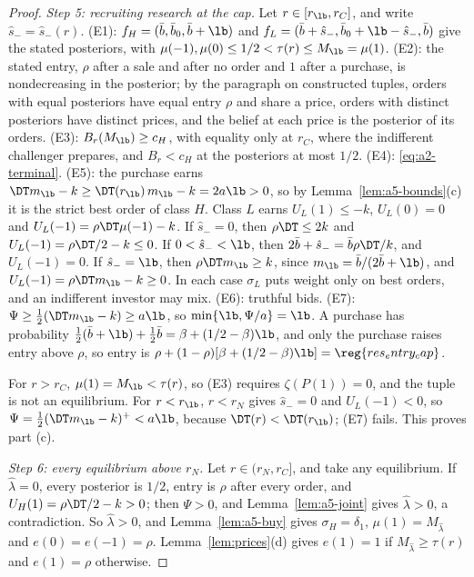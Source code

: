 \begin{proof}
\emph{Step 5: recruiting research at the cap.} Let \(r\in[r_{\lb},r_C]\), and write \(\hat s_-=\hat s_-(r)\). (E1):
\(f_H=(\bar b,\bar b_0,\bar b+\lb)\) and \(f_L=(\bar b+\hat s_-,\bar b_0+\lb-\hat s_-,\bar b)\) give the stated
posteriors, with \(\mu(-1),\mu(0)\le1/2<\tau(r)\le M_{\lb}=\mu(1)\). (E2): the stated entry, \(\rho\) after a sale and
after no order and \(1\) after a purchase, is nondecreasing in the posterior; by the paragraph on constructed tuples,
orders with equal posteriors have equal entry \(\rho\) and share a price, orders with distinct posteriors have
distinct prices, and the belief at each price is the posterior of its orders. (E3): \(B_r(M_{\lb})\ge c_H\), with
equality only at \(r_C\), where the indifferent challenger prepares, and \(B_r<c_H\) at the posteriors at most
\(1/2\). (E4): \eqref{eq:a2-terminal}. (E5): the purchase earns \(\DT m_{\lb}-k\ge\DT(r_{\lb})\,m_{\lb}-k=2a\lb>0\),
so by Lemma~\ref{lem:a5-bounds}(c) it is the strict best order of class \(H\). Class \(L\) earns \(U_L(1)\le-k\),
\(U_L(0)=0\) and \(U_L(-1)=\rho\DT\mu(-1)-k\). If \(\hat s_-=0\), then \(\rho\DT\le2k\) and
\(U_L(-1)=\rho\DT/2-k\le0\). If \(0<\hat s_-<\lb\), then \(2\bar b+\hat s_-=\bar b\rho\DT/k\), and \(U_L(-1)=0\). If
\(\hat s_-=\lb\), then \(\rho\DT m_{\lb}\ge k\), since \(m_{\lb}=\bar b/(2\bar b+\lb)\), and
\(U_L(-1)=\rho\DT m_{\lb}-k\ge0\). In each case \(\sigma_L\) puts weight only on best orders, and an indifferent
investor may mix. (E6): truthful bids. (E7): \(\Psi\ge\tfrac12(\DT m_{\lb}-k)\ge a\lb\), so
\(\min\{\lb,\Psi/a\}=\lb\). A purchase has probability \(\tfrac12(\bar b+\lb)+\tfrac12\bar b=\beta+(1/2-\beta)\lb\), and
only the purchase raises entry above \(\rho\), so entry is \(\rho+(1-\rho)[\beta+(1/2-\beta)\lb]=\reg{res_entry_cap}\).

For \(r>r_C\), \(\mu(1)=M_{\lb}<\tau(r)\), so (E3) requires \(\zeta(P(1))=0\), and the tuple is not an equilibrium. For
\(r<r_{\lb}\), \(r<r_N\) gives \(\hat s_-=0\) and \(U_L(-1)<0\), so \(\Psi=\tfrac12(\DT m_{\lb}-k)^+<a\lb\), because
\(\DT(r)<\DT(r_{\lb})\); (E7) fails. This proves part (c).

\emph{Step 6: every equilibrium above \(r_N\).} Let \(r\in(r_N,r_C]\), and take any equilibrium. If
\(\hat\lambda=0\), every posterior is \(1/2\), entry is \(\rho\) after every order, and \(U_H(1)=\rho\DT/2-k>0\); then
\(\Psi>0\), and Lemma~\ref{lem:a5-joint} gives \(\hat\lambda>0\), a contradiction. So \(\hat\lambda>0\), and
Lemma~\ref{lem:a5-buy} gives \(\sigma_H=\delta_1\), \(\mu(1)=M_{\hat\lambda}\) and \(e(0)=e(-1)=\rho\).
Lemma~\ref{lem:prices}(d) gives \(e(1)=1\) if \(M_{\hat\lambda}\ge\tau(r)\) and \(e(1)=\rho\) otherwise.


\end{proof}

